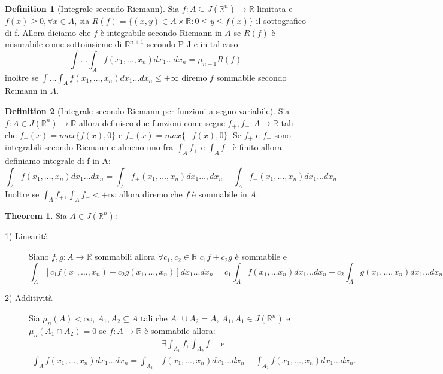 \documentclass[leqno]{article}
\theoremstyle{definition}
\newtheorem{definition}{Definition}[section]
\numberwithin{equation}{section}
\newtheorem{theorem}{Theorem}[section]
\theoremstyle{remark}
\begin{document}
	\begin{definition}[Integrale secondo Riemann]
		Sia $f:A\subseteq J(\mathbb{R}^n) \rightarrow \mathbb{R}$ limitata e $f(x)\ge 0, \forall x\in A$, sia $R(f)=\{(x,y)\in A\times \mathbb{R}: 0 \le y \le f(x)\} $ il sottografico di f. Allora diciamo che $f$ è integrabile secondo Riemann in $A$ se $R(f)$ è misurabile come sottoinsieme di $\mathbb{R}^{n+1}$ secondo P-J e in tal caso 
		\begin{equation}
			\int \dots \int_A f(x_1,\dots ,x_n)dx_1\dots dx_n=\mu_{n+1}R(f)
		\end{equation}
		inoltre se $\int \dots \int_A f(x_1,\dots ,x_n)dx_1\dots dx_n\le + \infty$ diremo $f$ sommabile secondo Reimann in $A$.
	\end{definition}
	\begin{definition}[Integrale secondo Riemann per funzioni a segno variabile]
		Sia $f:A\in J(\mathbb{R}^n) \rightarrow \mathbb{R}$ allora definisco due funzioni come segue $f_+,f_-:A\rightarrow \mathbb{R}$ tali che $f_+(x)=max\{f(x),0\}$ e $f_-(x)=max\{-f(x),0\}$. Se $f_+$ e $f_-$ sono integrabili secondo Riemann e almeno uno fra $\int_A f_+$ e $\int_A f_-$ è finito allora definiamo integrale di f in A:
		\begin{equation}
			\int_Af(x_1,\dots , x_n)dx_1\dots dx_n=\int_Af_+(x_1,\dots ,x_n)dx_1\dots , dx_n-\int_Af_-(x_1,\dots ,x_n)dx_1\dots dx_n
		\end{equation}
		Inoltre se $\int_A f_+,\int_A f_-<+\infty$ allora diremo che $f$ è sommabile in $A$.
	\end{definition}
	\begin{theorem}
		Sia $A\in J(\mathbb{R}^n)$:
		\begin{description}
			\item[1) Linearità] Siano $f,g:A\to \mathbb{R}$ sommabili allora $\forall c_1,c_2 \in \mathbb{R}$ $c_1f+c_2g$ è sommabile e 
			\begin{equation}
				\int_A[c_1f(x_1,\dots ,x_n)+c_2g(x_1,\dots ,x_n)]dx_1\dots dx_n= c_1\int_Af(x_1, \dots x_n)dx_1 \dots dx_n+c_2\int_Ag(x_1,\dots ,x_n)dx_1 \dots dx_n
			\end{equation}   
			\item[2) Additività] Sia $\mu_n(A)<\infty$, $A_1,A_2\subseteq A$ tali che $A_1\cup A_2=A, \, A_1,A_1\in J(\mathbb{R}^n)$ e $\mu_n(A_1\cap A_2)=0$ se $f:A\to \mathbb{R}$ è sommabile allora: 
			\begin{align*}
				&\exists \int_{A_1}f, \int_{A_2}f \quad \text{ e}\\
				\int_Af(x_1,\dots ,x_n)dx_1\dots dx_n=\int_{A_1} &f(x_1,\dots ,x_n)dx_1\dots dx_n+\int_{A_2}f(x_1,\dots ,x_n)dx_1\dots dx_n.
			\end{align*}
		\end{description}
	\end{theorem}
\end{document}
